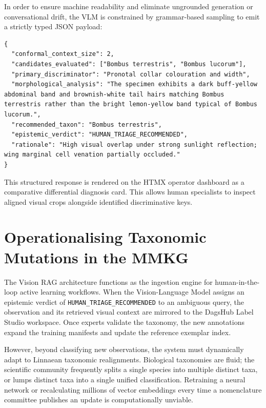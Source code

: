 In order to ensure machine readability and eliminate ungrounded generation or conversational drift, the VLM is constrained by grammar-based sampling to emit a strictly typed JSON payload:
\begin{verbatim}
{
  "conformal_context_size": 2,
  "candidates_evaluated": ["Bombus terrestris", "Bombus lucorum"],
  "primary_discriminator": "Pronotal collar colouration and width",
  "morphological_analysis": "The specimen exhibits a dark buff-yellow abdominal band and brownish-white tail hairs matching Bombus terrestris rather than the bright lemon-yellow band typical of Bombus lucorum.",
  "recommended_taxon": "Bombus terrestris",
  "epistemic_verdict": "HUMAN_TRIAGE_RECOMMENDED",
  "rationale": "High visual overlap under strong sunlight reflection; wing marginal cell venation partially occluded."
}
\end{verbatim}

This structured response is rendered on the HTMX operator dashboard as a comparative differential diagnosis card. This allows human specialists to inspect aligned visual crops alongside identified discriminative keys.

\section{Operationalising Taxonomic Mutations in the MMKG}
\label{sec:taxonomic_mutations}

The Vision RAG architecture functions as the ingestion engine for human-in-the-loop active learning workflows. When the Vision-Language Model assigns an epistemic verdict of \texttt{HUMAN\_\allowbreak TRIAGE\_\allowbreak RECOMMENDED} to an ambiguous query, the observation and its retrieved visual context are mirrored to the DagsHub Label Studio workspace. Once experts validate the taxonomy, the new annotations expand the training manifests and update the reference exemplar index.

However, beyond classifying new observations, the system must dynamically adapt to Linnaean taxonomic realignments. Biological taxonomies are fluid; the scientific community frequently splits a single species into multiple distinct taxa, or lumps distinct taxa into a single unified classification. Retraining a neural network or recalculating millions of vector embeddings every time a nomenclature committee publishes an update is computationally unviable. 

